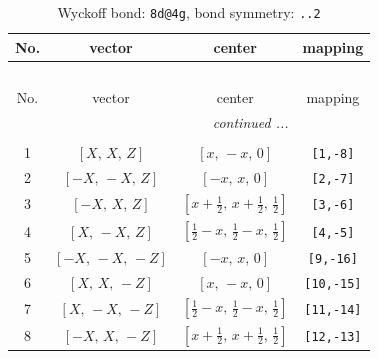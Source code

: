 \documentclass[fleqn,8pt]{jsarticle}
\begin{document}
\begin{longtable}{cccc}
\caption{Wyckoff bond: {\tt 8d@4g}, bond symmetry: {\tt ..2}}
 \\
 \hline \hline
No. & vector & center & mapping \\ \hline \endfirsthead

\multicolumn{3}{l}{\tablename\ \thetable{}} \\
 \hline \hline
No. & vector & center & mapping \\ \hline \endhead

 \hline \hline
\multicolumn{3}{r}{\footnotesize\it continued ...} \\ \endfoot

 \hline \hline
\multicolumn{3}{r}{} \\ \endlastfoot

1 & $\left[ X,\, X,\, Z \right]$ & $\left[ x,\, - x,\, 0 \right]$ & {\tt [1,-8]} \\ \hline
2 & $\left[ - X,\, - X,\, Z \right]$ & $\left[ - x,\, x,\, 0 \right]$ & {\tt [2,-7]} \\ \hline
3 & $\left[ - X,\, X,\, Z \right]$ & $\left[ x + \frac{1}{2},\, x + \frac{1}{2},\, \frac{1}{2} \right]$ & {\tt [3,-6]} \\ \hline
4 & $\left[ X,\, - X,\, Z \right]$ & $\left[ \frac{1}{2} - x,\, \frac{1}{2} - x,\, \frac{1}{2} \right]$ & {\tt [4,-5]} \\ \hline
5 & $\left[ - X,\, - X,\, - Z \right]$ & $\left[ - x,\, x,\, 0 \right]$ & {\tt [9,-16]} \\ \hline
6 & $\left[ X,\, X,\, - Z \right]$ & $\left[ x,\, - x,\, 0 \right]$ & {\tt [10,-15]} \\ \hline
7 & $\left[ X,\, - X,\, - Z \right]$ & $\left[ \frac{1}{2} - x,\, \frac{1}{2} - x,\, \frac{1}{2} \right]$ & {\tt [11,-14]} \\ \hline
8 & $\left[ - X,\, X,\, - Z \right]$ & $\left[ x + \frac{1}{2},\, x + \frac{1}{2},\, \frac{1}{2} \right]$ & {\tt [12,-13]} \\
\end{longtable}
\renewcommand{\arraystretch}{1.2}
\end{document}
